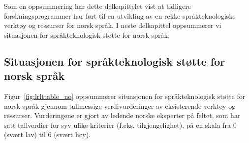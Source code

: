 \begin{multicols}{2}
Som en oppsummering har dette delkapittelet vist at tidligere forskningsprogrammer har ført til en utvikling av en rekke språkteknologiske verktøy og ressurser for norsk språk. 
I neste delkapittel oppsummerer vi situasjonen for språkteknologisk støtte for norsk språk. 
  
\subsection{Situasjonen for språkteknologisk støtte for norsk språk}
Figur~\ref{fig:lrlttable_no} oppsummerer situasjonen for språkteknologisk støtte for norsk språk gjennom tallmessige verdivurderinger av eksisterende verktøy og ressurser. Vurderingene er gjort av ledende norske eksperter på feltet, som har satt tallverdier for syv ulike kriterier (f.eks. tilgjengelighet), på en skala fra 0 (svært lav) til 6 (svært høy).


\end{multicols}
